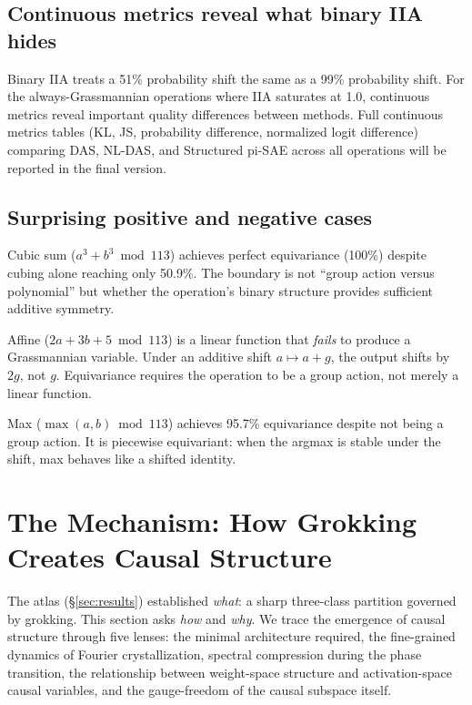 \documentclass{article}
\begin{document}
\subsection{Continuous metrics reveal what binary IIA hides}
\label{sec:continuous_metrics}

Binary IIA treats a 51\% probability shift the same as a 99\% probability shift.
For the always-Grassmannian operations where IIA saturates at 1.0, continuous
metrics reveal important quality differences between methods. Full continuous
metrics tables (KL, JS, probability difference, normalized logit difference)
comparing DAS, NL-DAS, and Structured pi-SAE across all operations will be
reported in the final version.

\subsection{Surprising positive and negative cases}

Cubic sum ($a^3 + b^3 \bmod 113$) achieves perfect equivariance (100\%) despite
cubing alone reaching only 50.9\%. The boundary is not ``group action versus
polynomial'' but whether the operation's binary structure provides sufficient
additive symmetry.

Affine ($2a + 3b + 5 \bmod 113$) is a linear function that \emph{fails} to
produce a Grassmannian variable. Under an additive shift $a \mapsto a + g$, the
output shifts by $2g$, not $g$. Equivariance requires the operation to be a group
action, not merely a linear function.

Max ($\max(a,b) \bmod 113$) achieves 95.7\% equivariance despite not being a
group action. It is piecewise equivariant: when the argmax is stable under the
shift, max behaves like a shifted identity.


\section{The Mechanism: How Grokking Creates Causal Structure}
\label{sec:mechanism}

The atlas (\S\ref{sec:results}) established \emph{what}: a sharp three-class
partition governed by grokking. This section asks \emph{how} and \emph{why}.
We trace the emergence of causal structure through five lenses: the minimal
architecture required, the fine-grained dynamics of Fourier crystallization,
spectral compression during the phase transition, the relationship between
weight-space structure and activation-space causal variables, and the
gauge-freedom of the causal subspace itself.
\end{document}
